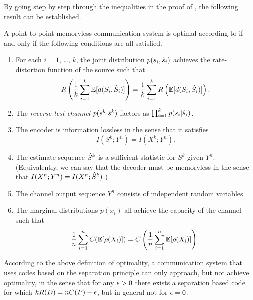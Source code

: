 By going step by step through the inequalities in the proof of
, the following result can be established. 

\begin{theorem}
  \label{thm:optimalityconditions}
  A point-to-point memoryless communication system is optimal according to
   if and only if the following conditions are all satisfied.
  \begin{enumerate}
    \item For each $i = 1$, \dots, $k$, the joint distribution $p(s_i,{\hat{s}}_i)$
      achieves the rate-distortion function of the source such that
      \[ R\left(\frac1k \sum_{i=1}^k \mathbb{E}[d(S_i,{\hat{S}}_i)] \right) = \frac1k
      \sum_{i=1}^k R\left( \mathbb{E}[d(S_i,{\hat{S}}_i)] \right).\]
    \item The \emph{reverse test channel} $p(s^k|{\hat{s}}^k)$ factors as
      $\prod_{i=1}^k p(s_i | {\hat{s}}_i)$. 
    \item The encoder is information lossless in the sense that it satisfies
      \[I(S^k;Y^n) = I(X^k; Y^n).\] 
    \item The estimate sequence ${\hat{S}}^k$ is a sufficient statistic for $S^k$
      given $Y^n$. (Equivalently, we can say that the decoder must be memoryless
      in the sense that $I(X^n;Y^n) = I(X^n;{\hat{S}}^k)$.)
    \item The channel output sequence $Y^n$ consists of independent random
      variables.
    \item The marginal distributions $p(x_i)$ all achieve the capacity of the
      channel such that
      \[ \frac1n \sum_{i=1}^n C(\mathbb{E}[\rho(X_i)]) = C\left( \frac1n \sum_{i=1}^n
      \mathbb{E}[\rho(X_i)] \right). \]
  \end{enumerate}
\end{theorem}


According to the above definition of optimality, a communication system that
uses codes based on the separation principle can only approach, but not achieve
optimality, in the sense that for any $\epsilon > 0$ there exists a separation based
code for which $kR(D) = nC(P) - \epsilon$, but in general not for $\epsilon = 0$. 


